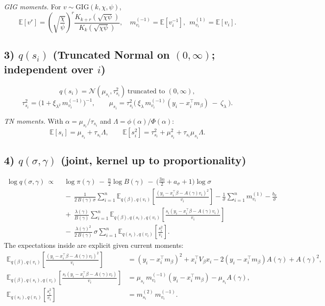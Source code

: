 \documentclass[11pt]{article}
\newcommand{\Normal}{\mathcal{N}}
\newcommand{\GIG}{\mathrm{GIG}}
\newcommand{\E}{\mathbb{E}}
\begin{document}
\emph{GIG moments.} For \(v\sim\GIG(k,\chi,\psi)\),
\[
\E[v^r]=\left(\sqrt{\frac{\chi}{\psi}}\right)^{\!r}
\frac{K_{k+r}(\sqrt{\chi\psi})}{K_{k}(\sqrt{\chi\psi})},\quad
m_{v_i}^{(-1)}=\E[v_i^{-1}],\ \ m_{v_i}^{(1)}=\E[v_i].
\]

\subsection*{3) \(q(s_i)\) (Truncated Normal on \((0,\infty)\); independent over \(i\))}
\[
\boxed{
q(s_i)=\Normal(\mu_{s_i},\tau_{s_i}^2)\ \text{truncated to }(0,\infty),
}
\]
\[
\boxed{
\tau_{s_i}^2=\Big(1+\xi_{\lambda^2}\,m_{v_i}^{(-1)}\Big)^{-1},\qquad
\mu_{s_i}= \tau_{s_i}^2\Big(\ \xi_{\lambda}\,m_{v_i}^{(-1)}(y_i-x_i^\top m_\beta)\ -\ \zeta_\lambda\ \Big).
}
\]

\emph{TN moments.} With \(\alpha=\mu_{s_i}/\tau_{s_i}\) and \(\Lambda=\phi(\alpha)/\Phi(\alpha)\):
\[
\E[s_i]=\mu_{s_i}+\tau_{s_i}\Lambda,\qquad
\E[s_i^2]=\tau_{s_i}^2+\mu_{s_i}^2+\tau_{s_i}\mu_{s_i}\Lambda.
\]

\subsection*{4) \(q(\sigma,\gamma)\) (joint, kernel up to proportionality)}
\[
\boxed{
\begin{aligned}
\log q(\sigma,\gamma)\ \propto\ 
&\ \log \pi(\gamma)\ -\ \frac{n}{2}\log B(\gamma)\ -\ \Big(\tfrac{3n}{2}+a_\sigma+1\Big)\log\sigma\\
&\ -\ \frac{1}{2\,B(\gamma)\,\sigma}\sum_{i=1}^n
\E_{q(\beta),q(v_i)}\!\left[\frac{(y_i-x_i^\top\beta-A(\gamma)v_i)^2}{v_i}\right]
-\frac{1}{\sigma}\sum_{i=1}^n m_{v_i}^{(1)}-\frac{b_\sigma}{\sigma}\\
&\ +\ \frac{\lambda(\gamma)}{B(\gamma)}\sum_{i=1}^n
\E_{q(\beta),q(s_i),q(v_i)}\!\left[\frac{s_i(y_i-x_i^\top\beta-A(\gamma)v_i)}{v_i}\right]\\
&\ -\ \frac{\lambda(\gamma)^2}{2\,B(\gamma)}\,\sigma \sum_{i=1}^n
\E_{q(s_i),q(v_i)}\!\left[\frac{s_i^2}{v_i}\right].
\end{aligned}}
\]
The expectations inside are explicit given current moments:
\[
\begin{aligned}
\E_{q(\beta),q(v_i)}\!\left[\frac{(y_i-x_i^\top\beta-A(\gamma)v_i)^2}{v_i}\right]
&= (y_i-x_i^\top m_\beta)^2 + x_i^\top V_\beta x_i -2(y_i-x_i^\top m_\beta)A(\gamma)+A(\gamma)^2,\\
\E_{q(\beta),q(s_i),q(v_i)}\!\left[\frac{s_i(y_i-x_i^\top\beta-A(\gamma)v_i)}{v_i}\right]
&= \mu_{s_i}\,m_{v_i}^{(-1)}(y_i-x_i^\top m_\beta) - \mu_{s_i}A(\gamma),\\
\E_{q(s_i),q(v_i)}\!\left[\frac{s_i^2}{v_i}\right]
&= m_{s_i}^{(2)}\,m_{v_i}^{(-1)}.
\end{aligned}
\]
\end{document}
